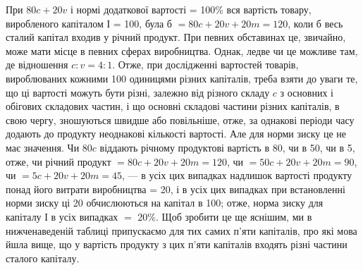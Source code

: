 При $80 c + 20 v$ і нормі додаткової вартості = 100\% вся вартість товару, виробленого капіталом І =
100, була б $= 80 c + 20 v + 20 m = 120$, коли б весь сталий капітал входив у річний продукт. При
певних обставинах це, звичайно, може мати місце
в певних сферах виробництва. Однак, ледве чи це можливе там,
де відношення $c : v = 4 : 1$. Отже, при дослідженні вартостей товарів, вироблюваних кожними 100
одиницями різних капіталів,
треба взяти до уваги те, що ці вартості можуть бути різні, залежно від різного складу $c$ з основних і
обігових складових
частин, і що основні складові частини різних капіталів, в свою
чергу, зношуються швидше або повільніше, отже, за однакові
періоди часу додають до продукту неоднакові кількості вартості. Але для норми зиску це не має
значення. Чи $80 c$ віддають
річному продуктові вартість в 80, чи в 50, чи в 5, отже, чи річний
продукт $= 80 c + 20 v + 20 m = 120$, чи $= 50 c + 20 v + 20 m = 90$, чи $= 5 c + 20 v + 20 m = 45$, — в
усіх цих випадках надлишок
вартості продукту понад його витрати виробництва = 20, і в усіх
цих випадках при встановленні норми зиску ці 20 обчислюються
на капітал в 100; отже, норма зиску для капіталу І в усіх випадках $=$ 20\%. Щоб зробити це ще яснішим,
ми в нижченаведеній
таблиці припускаємо для тих самих п’яти капіталів, про які мова
йшла вище, що у вартість продукту з цих п’яти капіталів входять різні частини сталого капіталу.
